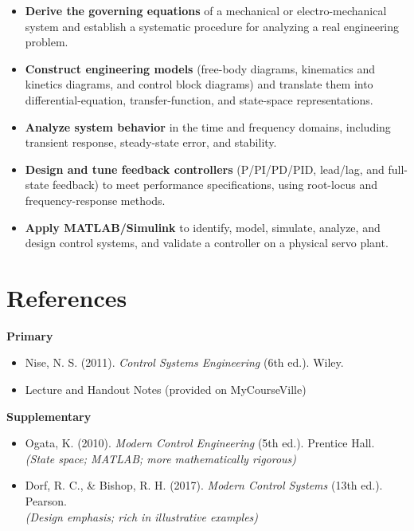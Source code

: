 \documentclass[11pt]{article}
\begin{document}
\begin{itemize}
    \item \textbf{Derive the governing equations} of a mechanical or electro-mechanical
          system and establish a systematic procedure for analyzing a real engineering
          problem.
    \item \textbf{Construct engineering models} (free-body diagrams, kinematics and
          kinetics diagrams, and control block diagrams) and translate them into
          differential-equation, transfer-function, and state-space representations.
    \item \textbf{Analyze system behavior} in the time and frequency domains, including
          transient response, steady-state error, and stability.
    \item \textbf{Design and tune feedback controllers} (P/PI/PD/PID, lead/lag, and
          full-state feedback) to meet performance specifications, using root-locus and
          frequency-response methods.
    \item \textbf{Apply MATLAB/Simulink} to identify, model, simulate, analyze, and
          design control systems, and validate a controller on a physical servo plant.
\end{itemize}

\section{References}
\textbf{Primary}
\begin{itemize}
      \item Nise, N. S. (2011). \emph{Control Systems Engineering} (6th ed.). Wiley.
      \item Lecture and Handout Notes (provided on MyCourseVille)
\end{itemize}
\textbf{Supplementary}
\begin{itemize}
    \item Ogata, K. (2010). \emph{Modern Control Engineering} (5th ed.). Prentice Hall.
          \\\hfill\textit{(State space; MATLAB; more mathematically rigorous)}
    \item Dorf, R. C., \& Bishop, R. H. (2017). \emph{Modern Control Systems} (13th ed.). Pearson.
          \\\hfill\textit{(Design emphasis; rich in illustrative examples)}
\end{itemize}
\end{document}
